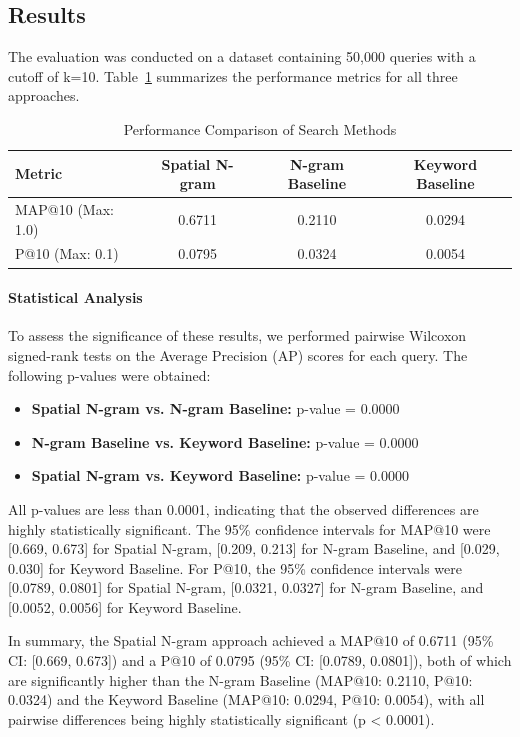 \documentclass[manuscript,screen]{acmart}
\begin{document}
\subsection{Results}

The evaluation was conducted on a dataset containing 50,000 queries with a cutoff of k=10. Table~\ref{tab:results} summarizes the performance metrics for all three approaches.

\begin{table}[t]
  \caption{Performance Comparison of Search Methods}
  \label{tab:results}
  \begin{tabular}{lccc}
    \toprule
    \textbf{Metric} & \textbf{Spatial N-gram} & \textbf{N-gram Baseline} & \textbf{Keyword Baseline} \\
    \midrule
    MAP@10 (Max: 1.0) & 0.6711 & 0.2110 & 0.0294 \\
    P@10 (Max: 0.1) & 0.0795 & 0.0324 & 0.0054 \\
    \bottomrule
  \end{tabular}
\end{table}

\paragraph{Statistical Analysis}

To assess the significance of these results, we performed pairwise Wilcoxon signed-rank tests on the Average Precision (AP) scores for each query. The following p-values were obtained:

\begin{itemize}
    \item \textbf{Spatial N-gram vs. N-gram Baseline:} p-value = 0.0000
    \item \textbf{N-gram Baseline vs. Keyword Baseline:} p-value = 0.0000
    \item \textbf{Spatial N-gram vs. Keyword Baseline:} p-value = 0.0000
\end{itemize}

All p-values are less than 0.0001, indicating that the observed differences are highly statistically significant. The 95\% confidence intervals for MAP@10 were [0.669, 0.673] for Spatial N-gram, [0.209, 0.213] for N-gram Baseline, and [0.029, 0.030] for Keyword Baseline. For P@10, the 95\% confidence intervals were [0.0789, 0.0801] for Spatial N-gram, [0.0321, 0.0327] for N-gram Baseline, and [0.0052, 0.0056] for Keyword Baseline.

In summary, the Spatial N-gram approach achieved a MAP@10 of 0.6711 (95\% CI: [0.669, 0.673]) and a P@10 of 0.0795 (95\% CI: [0.0789, 0.0801]), both of which are significantly higher than the N-gram Baseline (MAP@10: 0.2110, P@10: 0.0324) and the Keyword Baseline (MAP@10: 0.0294, P@10: 0.0054), with all pairwise differences being highly statistically significant (p < 0.0001).
\end{document}
